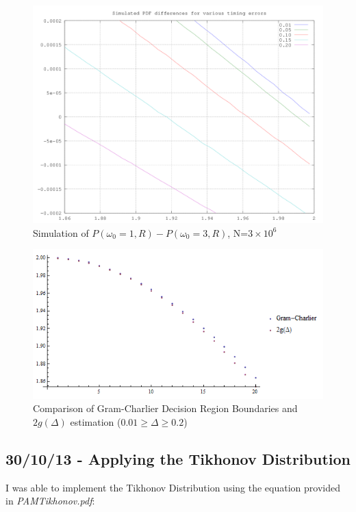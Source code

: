 \begin{figure}[htbp]
\centering
\includegraphics[width=\linewidth]{../../../plots/simdrb.png}
\caption{Simulation of $P(\omega_0=1,R)-P(\omega_0=3,R)$,
N=$3 \times 10^6$}
\end{figure}

\begin{figure}[htbp]
\centering
\includegraphics[width=\linewidth]{../../../plots/gc_vs_2g.png}
\caption{Comparison of Gram-Charlier Decision Region Boundaries and
$2 g(\Delta)$ estimation ($0.01 \ge \Delta \ge 0.2$)}
\end{figure}

\subsection{30/10/13 - Applying the Tikhonov Distribution}

I was able to implement the Tikhonov Distribution using the equation
provided in \emph{PAMTikhonov.pdf}:

